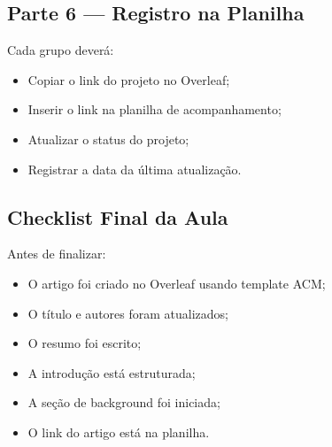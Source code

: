 
\subsection{Parte 6 — Registro na Planilha}

\begin{boxAtividade}

Cada grupo deverá:

\begin{itemize}
\item Copiar o link do projeto no Overleaf;
\item Inserir o link na planilha de acompanhamento;
\item Atualizar o status do projeto;
\item Registrar a data da última atualização.
\end{itemize}

\end{boxAtividade}


\subsection{Checklist Final da Aula}

\begin{boxAtividade}

Antes de finalizar:

\begin{itemize}
\item O artigo foi criado no Overleaf usando template ACM;
\item O título e autores foram atualizados;
\item O resumo foi escrito;
\item A introdução está estruturada;
\item A seção de background foi iniciada;
\item O link do artigo está na planilha.
\end{itemize}

\end{boxAtividade}
